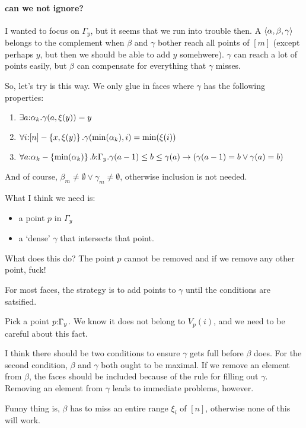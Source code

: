 \documentclass[csh.tex]{subfiles}
\begin{document}
\paragraph{can we not ignore?}
I wanted to focus on $\Gamma_y$, but it seems that we run into trouble then.
A $\left\langle \alpha,\beta,\gamma \right\rangle$ belongs to the complement when 
$\beta$ and $\gamma$ bother reach all points of $[m]$ (except perhaps $y$, but 
then we should be able to add $y$ somehwere). $\gamma$ can reach a lot of points
easily, but $\beta$ can compensate for everything that $\gamma$ misses.

So, let's try is this way. We only glue in faces where $\gamma$ has the 
following properties:
\begin{enumerate}
  \item $\exists a\mathord :\alpha_k.\gamma(a,\xi(y)) = y$
  \item $\forall i\mathord :[n]-\left\{x,\xi(y)\right\}. \gamma(\min(\alpha_k),i) = \min(\xi(i))$
  \item $\forall a\mathord :\alpha_k-\left\{\min(\alpha_k)\right\}. b\mathord :\Gamma_y. 
  \gamma(a-1)\leq b \leq \gamma(a) \to (\gamma(a-1) = b \vee \gamma(a) = b)$
\end{enumerate}
And of course, $\beta_m\neq \emptyset \vee \gamma_m\neq \emptyset$, otherwise
inclusion is not needed.

What I think we need is:
\begin{itemize}
  \item a point $p$ in $\Gamma_y$
  \item a `dense' $\gamma$ that intersects that point.
\end{itemize}
What does this do? The point $p$ cannot be removed and if we remove any other 
point, fuck! 

For most faces, the strategy is to add points to $\gamma$ until the conditions 
are satsified. 

Pick a point $p\mathord :\Gamma_y$. We know it does not belong to $V_p(i)$, and we need
to be careful about this fact.

I think there should be two conditions to ensure $\gamma$ gets full before 
$\beta$ does. For the second condition, $\beta$ and $\gamma$ both ought to be
maximal. If we remove an element from $\beta$, the faces should be included
because of the rule for filling out $\gamma$. Removing an element from $\gamma$
leads to immediate problems, however.

Funny thing is, $\beta$ has to miss an entire range $\xi_i$ of $[n]$, otherwise
none of this will work.
\end{document}
